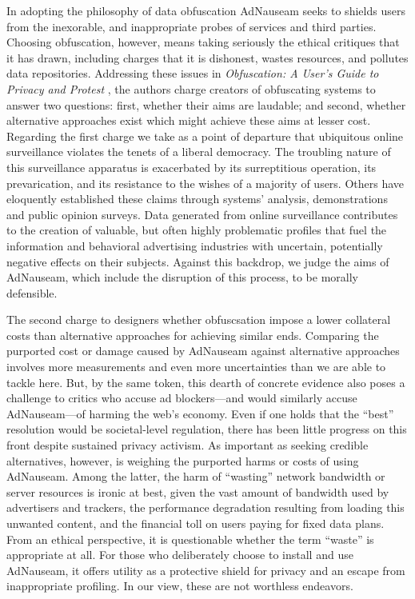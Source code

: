 \documentclass[conference]{IEEEtran}
\begin{document}
In adopting the philosophy of data obfuscation AdNauseam seeks to shields users from the inexorable, and inappropriate probes of services and third parties. Choosing obfuscation, however, means taking seriously the ethical critiques that it has drawn, including charges that it is dishonest, wastes resources, and pollutes data repositories. Addressing these issues in \emph{Obfuscation: A User's Guide to Privacy and Protest} \cite{Brunton}, the authors charge creators of obfuscating systems to answer two questions: first, whether their aims are laudable; and second, whether alternative approaches exist which might achieve these aims at lesser cost. Regarding the first charge we take as a point of departure that ubiquitous online surveillance violates the tenets of a liberal democracy. The troubling nature of this surveillance apparatus is exacerbated by its surreptitious operation, its prevarication, and its resistance to the wishes of a majority of users. Others have eloquently established these claims through systems' analysis, demonstrations and public opinion surveys. \cite{Turow, Goldfarb, Tucker} Data generated from online surveillance contributes to the creation of valuable, but often highly problematic profiles that fuel the information and behavioral advertising industries with uncertain, potentially negative effects on their subjects. Against this backdrop, we judge the aims of AdNauseam, which include the disruption of this process, to be morally defensible.

The second charge to designers whether obfuscsation impose a lower collateral costs than alternative approaches for achieving similar ends. Comparing the purported cost or damage caused by AdNauseam against alternative approaches involves more measurements and even more uncertainties than we are able to tackle here. But, by the same token, this dearth of concrete evidence also poses a challenge to critics who accuse ad blockers---and would similarly accuse AdNauseam---of harming the web's economy. Even if one holds that the “best” resolution would be societal-level regulation, there has been little progress on this front despite sustained privacy activism. As important as seeking credible alternatives, however, is weighing the purported harms or costs of using AdNauseam. Among the latter, the harm of “wasting” network bandwidth or server resources is ironic at best, given the vast amount of bandwidth used by advertisers and trackers, the performance degradation resulting from loading this unwanted content, and the financial toll on users paying for fixed data plans. From an ethical perspective, it is questionable whether the term “waste” is appropriate at all. For those who deliberately choose to install and use AdNauseam, it offers utility as a protective shield for privacy and an escape from inappropriate profiling. In our view, these are not worthless endeavors.
\end{document}

